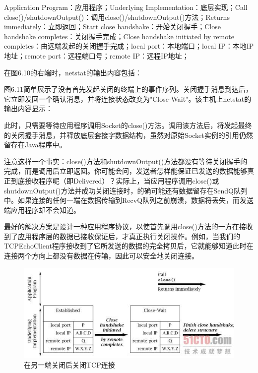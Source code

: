 		Application Program：应用程序；Underlying Implementation：底层实现；Call close()/shutdownOutput()：调用close()/shutdownOutput()方法；Returns immediately：立即返回；Start close handshake：开始关闭握手；Close handshake completes：关闭握手完成；Close handshake initiated by remote completes：由远端发起的关闭握手完成；local port：本地端口；local IP：本地IP地址；remote port：远程端口号；remote IP：远程IP地址；

		在图6.10的右端时，netstat的输出内容包括：

		

		图6.11简单展示了没有首先发起关闭的终端上的事件序列。关闭握手消息到达后，它立即发回一个确认消息，并将连接状态改变为"Close-Wait"。该主机上netstat的输出内容显示：

		

		此时，只需要等待应用程序调用Socket的close()方法。调用该方法后，将发起最终的关闭握手消息，并释放底层套接字数据结构，虽然对原始Socket实例的引用仍然留存在Java程序中。

		注意这样一个事实：close()方法和shutdownOutput()方法都没有等待关闭握手的完成，而是调用后立即返回。你可能会问，发送者怎样能保证已发送的数据能够真正到底接收程序呢（即Delivered）？实际上，当应用程序调用close()或shutdownOutput()方法并成功关闭连接时，的确可能还有数据留存在SendQ队列中。如果连接的任何一端在数据传输到RecvQ队列之前崩溃，数据将丢失，而发送端应用程序却不会知道。

		最好的解决方案是设计一种应用程序协议，以使首先调用close()方法的一方在接收到了应用程序层的数据已接收保证后，才真正执行关闭操作。例如，当我们的TCPEchoClient程序接收到了它所发送的数据的完全拷贝后，它就能够知道此时在连接两个方向上都没有数据在传输，因此可以安全地关闭连接。


		\clearpage

		\begin{figure}[htbp]%
			\centering
			\includegraphics[scale=.6]{img/06.11.jpg}
			\caption{在另一端关闭后关闭TCP连接}
			\label{fig:close.other.side.side.tcp}
		\end{figure}

